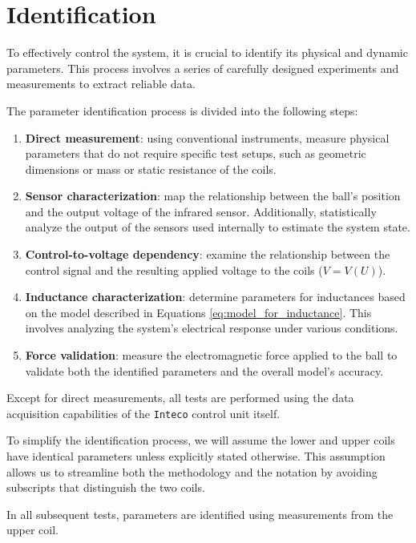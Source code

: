 \section{Identification}
\label{sec:identification}

To effectively control the system, it is crucial to identify its physical and dynamic parameters.
This process involves a series of carefully designed experiments and measurements to extract reliable data.

The parameter identification process is divided into the following steps:

\begin{enumerate}
    \item \textbf{Direct measurement}: using conventional instruments, measure physical parameters that do not require specific test setups, such as geometric dimensions or mass or static resistance of the coils.
    \item \textbf{Sensor characterization}: map the relationship between the ball's position and the output voltage of the infrared sensor. Additionally, statistically analyze the output of the sensors used internally to estimate the system state.
    \item \textbf{Control-to-voltage dependency}: examine the relationship between the control signal and the resulting applied voltage to the coils ($V = V(U)$).
    \item \textbf{Inductance characterization}: determine parameters for inductances based on the model described in Equations \ref{eq:model_for_inductance}. This involves analyzing the system's electrical response under various conditions.
    \item \textbf{Force validation}: measure the electromagnetic force applied to the ball to validate both the identified parameters and the overall model's accuracy.
\end{enumerate}

Except for direct measurements, all tests are performed using the data acquisition capabilities of the \texttt{Inteco} control unit itself.

To simplify the identification process, we will assume the lower and upper coils have identical parameters unless explicitly stated otherwise.
This assumption allows us to streamline both the methodology and the notation by avoiding subscripts that distinguish the two coils.

In all subsequent tests, parameters are identified using measurements from the upper coil.






